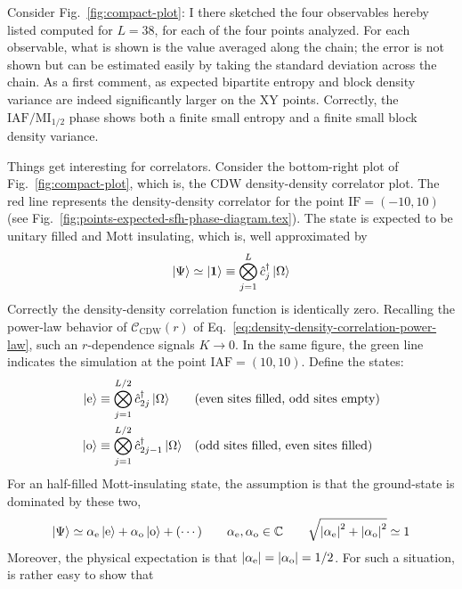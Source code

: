 Consider Fig.~\ref{fig:compact-plot}: I there sketched the four observables hereby listed computed for $L=38$, for each of the four points analyzed. For each observable, what is shown is the value averaged along the chain; the error is not shown but can be estimated easily by taking the standard deviation across the chain. As a first comment, as expected bipartite entropy and block density variance are indeed significantly larger on the $\mathrm{XY}$ points. Correctly, the $\mathrm{IAF}/\mathrm{MI}_{1/2}$ phase shows both a finite small entropy and a finite small block density variance.

Things get interesting for correlators. Consider the bottom-right plot of Fig.~\ref{fig:compact-plot}, which is, the $\mathrm{CDW}$ density-density correlator plot. The red line represents the density-density correlator for the point $\mathrm{IF}=(-10,10)$ (see Fig.~\ref{fig:points-expected-sfh-phase-diagram.tex}). The state is expected to be unitary filled and Mott insulating, which is, well approximated by
\begin{equation}\label{eq:unitary-state-definition}
	\ket{\Psi} \simeq \ket{\bm{1}} \equiv \bigotimes_{j=1}^L \hat c_j^\dagger \ket{\Omega}
\end{equation}
Correctly the density-density correlation function is identically zero. Recalling the power-law behavior of $\mathcal{C}_\mathrm{CDW}(r)$ of Eq.~\eqref{eq:density-density-correlation-power-law}, such an $r$-dependence signals $K \to 0$. In the same figure, the green line indicates the simulation at the point $\mathrm{IAF}=(10,10)$. Define the states:
\begin{align}
	\ket{\mathrm{e}} &\equiv \bigotimes_{j=1}^{L/2} \hat c_{2j}^\dagger \ket{\Omega}
	&&\text{(even sites filled, odd sites empty)}
	\label{eq:even-state-definition}
	\\
	\ket{\mathrm{o}} &\equiv \bigotimes_{j=1}^{L/2} \hat c_{2j-1}^\dagger \ket{\Omega}
	&&\text{(odd sites filled, even sites filled)}
	\label{eq:odd-state-definition}
\end{align}
For an half-filled Mott-insulating state, the assumption is that the ground-state is dominated by these two,
\[
	\ket{\Psi} \simeq \alpha_\mathrm{e} \ket{\mathrm{e}} + \alpha_\mathrm{o} \ket{\mathrm{o}} + (\cdots)
	\qquad
	\alpha_\mathrm{e}, \alpha_\mathrm{o} \in \mathbb{C}
	\qquad
	\sqrt{\abs{\alpha_\mathrm{e}}^2 + \abs{\alpha_\mathrm{o}}^2} \simeq 1
\]
Moreover, the physical expectation is that $\abs{\alpha_\mathrm{e}} = \abs{\alpha_\mathrm{o}} = 1/2$. For such a situation, is rather easy to show that
